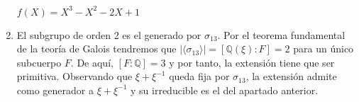 \begin{enumerate}
$f(X) = X^3-X^2-2X+1$

\item El subgrupo de orden 2 es el generado por $\sigma_{13}$. Por el teorema fundamental de la teoría de Galois tendremos que $|\langle \sigma_{13} \rangle| = [\mathbb{Q}(\xi):F] = 2$ para un único subcuerpo $F$. De aquí, $[F:\mathbb{Q}] = 3$ y por tanto, la extensión tiene que ser primitiva. Observando que $\xi + \xi^{-1}$ queda fija por $\sigma_{13}$, la extensión admite como generador a $\xi + \xi^{-1}$ y su irreducible es el del apartado anterior. 
\end{enumerate}